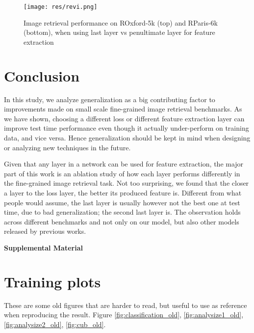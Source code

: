 \documentclass[10pt,twocolumn,letterpaper]{article}
\begin{document}
\begin{figure}
  \texttt{[image: res/revi.png]}
  \vspace{2pt}
  \caption{Image retrieval performance on ROxford-5k (top) and RParis-6k (bottom), when using last layer vs penultimate layer for feature extraction}
  \label{fig:revi}
\end{figure}


\section{Conclusion}

In this study, we analyze generalization as a big contributing factor to improvements made on small scale fine-grained image retrieval benchmarks. As we have shown, choosing a different loss or different feature extraction layer can improve test time performance even though it actually under-perform on training data, and vice versa. Hence generalization should be kept in mind when designing or analyzing new techniques in the future.

Given that any layer in a network can be used for feature extraction, the major part of this work is an ablation study of how each layer performs differently in the fine-grained image retrieval task. Not too surprising, we found that the closer a layer to the loss layer, the better its produced feature is. Different from what people would assume, the last layer is usually however not the best one at test time, due to bad generalization; the second last layer is. The observation holds across different benchmarks and not only on our model, but also other models released by previous works.


{\small


}

\newpage
\clearpage
\newpage
\clearpage
\setcounter{equation}{0}
\setcounter{section}{0}
\setcounter{page}{1}

\begin{center}
\textbf{\large Supplemental Material}
\end{center}




\section{Training plots}

These are some old figures that are harder to read, but useful to use as reference when reproducing the result. Figure \ref{fig:classification_old}, \ref{fig:analysize1_old}, \ref{fig:analysize2_old}, \ref{fig:cub_old}.
\end{document}
